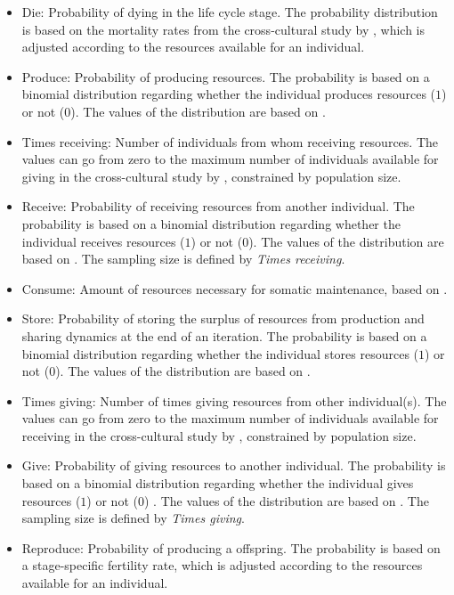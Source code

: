 \documentclass{article}
\begin{document}
\begin{itemize}
    \item Die: Probability of dying in the life cycle stage. The probability distribution is based on the mortality rates from the cross-cultural study by \cite{gurven2007longevity}, which is adjusted according to the resources available for an individual.
    \item Produce: Probability of producing resources. The probability is based on a binomial distribution regarding whether the individual produces resources ($1$) or not ($0$). The values of the distribution are based on \cite{koster2020life}.
    \item Times receiving: Number of individuals from whom receiving resources. The values can go from zero to the maximum number of individuals available for giving in the cross-cultural study by \cite{gurven2004give}, constrained by population size.
    \item Receive: Probability of receiving resources from another individual. The probability is based on a binomial distribution regarding whether the individual receives resources ($1$) or not ($0$). The values of the distribution are based on \cite{gurven2004give}. The sampling size is defined by \emph{Times receiving}.
    \item Consume: Amount of resources necessary for somatic maintenance, based on \cite{kaplan2000theory,pontzer2021daily}.
    \item Store: Probability of storing the surplus of resources from production and sharing dynamics at the end of an iteration. The probability is based on a binomial distribution regarding whether the individual stores resources ($1$) or not ($0$). The values of the distribution are based on \citep{bowles2011cultivation}.
    \item Times giving: Number of times giving resources from other individual(s). The values can go from zero to the maximum number of individuals available for receiving in the cross-cultural study by \cite{gurven2004give}, constrained by population size.
    \item Give: Probability of giving resources to another individual. The probability is based on a binomial distribution regarding whether the individual gives resources ($1$) or not ($0$) . The values of the distribution are based on \cite{gurven2004give}. The sampling size is defined by \emph{Times giving}.
    \item Reproduce: Probability of producing a offspring. The probability is based on a stage-specific fertility rate, which is adjusted according to the resources available for an individual.

\end{itemize}
\end{document}
